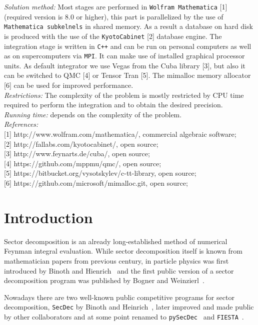 \documentclass[preprint,12pt]{elsarticle}
\begin{document}
\begin{small}
{\em Solution method:}
Most stages are performed in {\tt Wolfram Mathematica} [1] (required version is 8.0 or higher), this part
is parallelized by the use of {\tt Mathematica subkelnels} in shared memory. As a result a database on hard disk is produced with the use of the {\tt KyotoCabinet} [2] database engine. The integration stage is written in {\tt C++} and can be run on personal computers as well as on supercomputers via {\tt MPI}. It can make use of installed graphical processor units. As default integrator we use Vegas from the Cuba library [3], but also it can be switched to QMC [4] or Tensor Tran [5]. The mimalloc memory allocator [6] can be used for improved performance.
\\
{\em Restrictions:} The complexity of the problem is mostly restricted
by CPU time required to perform the integration and to obtain the desired precision.\\
{\em Running time:} depends on the complexity of the problem.\\
{\em References:} 
{\\} [1] http://www.wolfram.com/mathematica/, commercial algebraic software; 
{\\} [2] http://fallabs.com/kyotocabinet/, open source;
{\\} [3] http://www.feynarts.de/cuba/, open source; 
{\\} [4] https://github.com/mppmu/qmc/, open source; 
{\\} [5] https://bitbucket.org/vysotskylev/c-tt-library, open source; 
{\\} [6] https://github.com/microsoft/mimalloc.git, open source; 


\end{small}

\newpage

\section{Introduction}

Sector decomposition is an already long-established method of numerical Feynman integral evaluation.
While sector decomposition itself is known from mathematician papers from previous century,
in particle physics was first introduced by Binoth and Hienrich~\cite{Binoth:2000ps,Binoth:2003ak,Binoth:2004jv,Heinrich:2008si} and the first public version of a sector decomposition program was published
by Bogner and Weinzierl~\cite{Bogner:2007cr,Bogner:2008ry}.

Nowadays there are two well-known public competitive programs for sector decomposition,
{\tt SecDec} by Binoth and Heinrich~\cite{Heinrich:2008si},
later improved and made public by other collaborators and at some point renamed to {\tt pySecDec}~\cite{Carter:2010hi,Borowka:2012yc,Borowka:2012ii,Borowka:2012rt,Borowka:2013cma,Borowka:2013lda,Borowka:2014koa,Borowka:2015mxa,Borowka:2017idc,Jahn:2018jml,heinrich2021expansion}
and {\tt FIESTA}~\cite{Smirnov:2008py,Smirnov:2009pb,Smirnov:2013eza,Smirnov:2015mct}.
\end{document}
